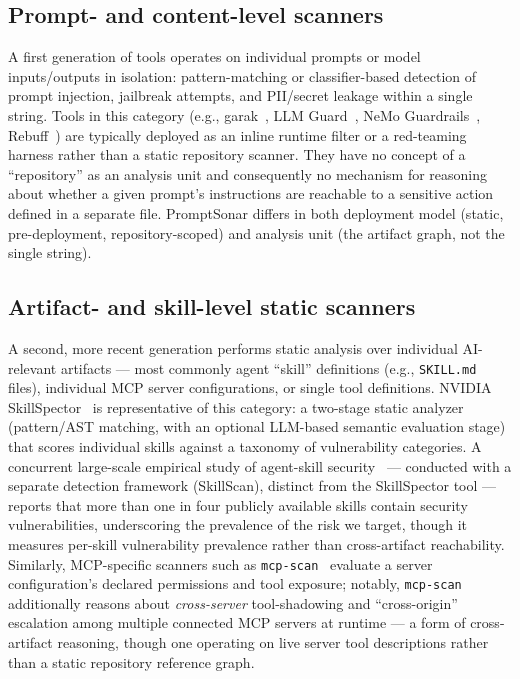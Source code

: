 \documentclass[sigconf,anonymous,review]{acmart}
\newcommand{\sysname}{PromptSonar}
\begin{document}
\subsection{Prompt- and content-level scanners}
A first generation of tools operates on individual prompts or model inputs/outputs in isolation: pattern-matching or classifier-based detection of prompt injection, jailbreak attempts, and PII/secret leakage within a single string. Tools in this category (e.g., garak~\cite{garak}, LLM Guard~\cite{llmguard}, NeMo Guardrails~\cite{nemoguardrails}, Rebuff~\cite{rebuff}) are typically deployed as an inline runtime filter or a red-teaming harness rather than a static repository scanner. They have no concept of a ``repository'' as an analysis unit and consequently no mechanism for reasoning about whether a given prompt's instructions are reachable to a sensitive action defined in a separate file. \sysname{} differs in both deployment model (static, pre-deployment, repository-scoped) and analysis unit (the artifact graph, not the single string).

\subsection{Artifact- and skill-level static scanners}
A second, more recent generation performs static analysis over individual AI-relevant artifacts --- most commonly agent ``skill'' definitions (e.g., \texttt{SKILL.md} files), individual MCP server configurations, or single tool definitions. NVIDIA SkillSpector~\cite{skillspector} is representative of this category: a two-stage static analyzer (pattern/AST matching, with an optional LLM-based semantic evaluation stage) that scores individual skills against a taxonomy of vulnerability categories. A concurrent large-scale empirical study of agent-skill security~\cite{liuskills2026} --- conducted with a separate detection framework (SkillScan), distinct from the SkillSpector tool --- reports that more than one in four publicly available skills contain security vulnerabilities, underscoring the prevalence of the risk we target, though it measures per-skill vulnerability prevalence rather than cross-artifact reachability. Similarly, MCP-specific scanners such as \texttt{mcp-scan}~\cite{mcpscan} evaluate a server configuration's declared permissions and tool exposure; notably, \texttt{mcp-scan} additionally reasons about \emph{cross-server} tool-shadowing and ``cross-origin'' escalation among multiple connected MCP servers at runtime --- a form of cross-artifact reasoning, though one operating on live server tool descriptions rather than a static repository reference graph.
\end{document}
